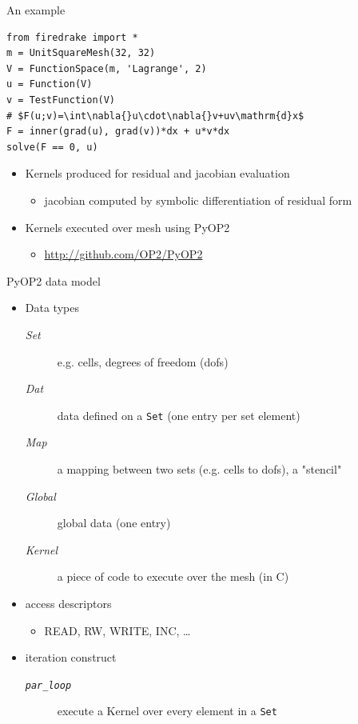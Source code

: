 \documentclass[bigger]{beamer}
\begin{document}
\begin{frame}[fragile,label={sec:orgheadline6}]{An example}
 \begin{verbatim}
from firedrake import *
m = UnitSquareMesh(32, 32)
V = FunctionSpace(m, 'Lagrange', 2)
u = Function(V)
v = TestFunction(V)
# $F(u;v)=\int\nabla{}u\cdot\nabla{}v+uv\mathrm{d}x$
F = inner(grad(u), grad(v))*dx + u*v*dx
solve(F == 0, u)
\end{verbatim}
\begin{itemize}
\item Kernels produced for residual and jacobian evaluation
\begin{itemize}
\item jacobian computed by symbolic differentiation of
residual form
\end{itemize}
\item Kernels executed over mesh using PyOP2
\begin{itemize}
\item \url{http://github.com/OP2/PyOP2}
\end{itemize}
\end{itemize}
\end{frame}

\begin{frame}[fragile,label={sec:orgheadline7}]{PyOP2 data model}
 \begin{itemize}
\item Data types
\begin{description}
\item[{\emph{Set}}] e.g. cells, degrees of freedom (dofs)
\item[{\emph{Dat}}] data defined on a \texttt{Set} (one entry per set element)
\item[{\emph{Map}}] a mapping between two sets (e.g. cells to dofs), a "stencil"
\item[{\emph{Global}}] global data (one entry)
\item[{\emph{Kernel}}] a piece of code to execute over the mesh (in C)
\end{description}
\item access descriptors
\begin{itemize}
\item READ, RW, WRITE, INC, \ldots{}
\end{itemize}
\item iteration construct
\begin{description}
\item[{\emph{\texttt{par\_loop}}}] execute a Kernel over every element in a \texttt{Set}
\end{description}
\end{itemize}
\end{frame}
\end{document}
